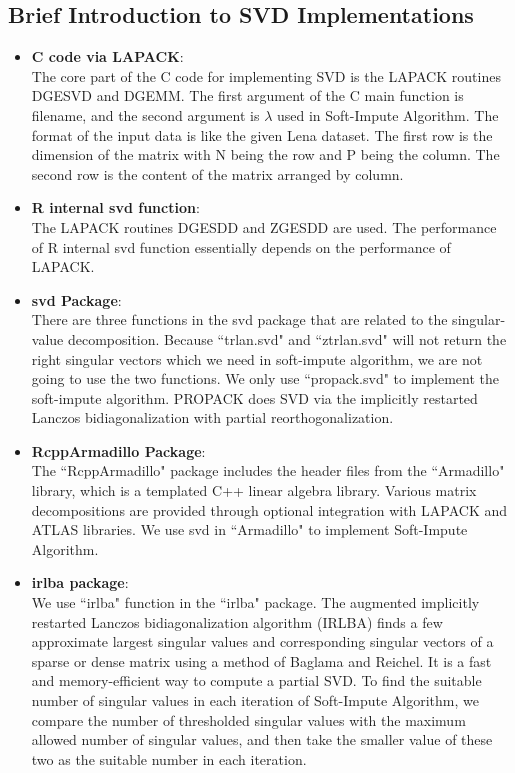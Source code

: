 \documentclass[12pt]{article}
\begin{document}
\subsection{Brief Introduction to SVD Implementations}
\begin{itemize}
	\item \textbf{C code via LAPACK}:\\
	The core part of the C code for implementing SVD is the LAPACK routines DGESVD and DGEMM. The first argument of the C main function is filename, and the second argument is $\lambda$ used in Soft-Impute Algorithm. The format of the input data is like the given Lena dataset. The first row is the dimension of the matrix with N being the row and P being the column. The second row is the content of the matrix arranged by column.
		\item \textbf{R internal svd function}: \\
	The LAPACK routines DGESDD and ZGESDD are used. The performance of R internal svd function essentially depends on the performance of LAPACK.
	\item \textbf{svd Package}: \\
	There are three functions in the svd package that are related to the singular-value decomposition. Because ``trlan.svd" and ``ztrlan.svd" will not return the right singular vectors which we need in soft-impute algorithm,  we are not going to use the two functions. We only use ``propack.svd" to implement the soft-impute algorithm. PROPACK does SVD via the implicitly restarted Lanczos bidiagonalization with partial reorthogonalization.
	\item \textbf{RcppArmadillo Package}: \\	
	The ``RcppArmadillo" package includes the header files from the ``Armadillo" library, which is a templated C++ linear algebra library. Various matrix decompositions are provided through optional integration with LAPACK and ATLAS libraries.  We use svd in ``Armadillo" to implement Soft-Impute Algorithm.
	\item \textbf{irlba package}: \\
	We use ``irlba" function in the ``irlba" package. The augmented implicitly restarted Lanczos bidiagonalization algorithm (IRLBA) finds a few approximate largest singular values and corresponding singular vectors of a sparse or dense matrix using a method of Baglama and Reichel. It is a fast and memory-efficient way to compute a partial SVD.
	To find the suitable number of singular values in each iteration of Soft-Impute Algorithm, we compare the number of thresholded singular values with the maximum allowed number of singular values, and then take the smaller value of these two as the suitable number in each iteration.
\end{itemize}
\end{document}
